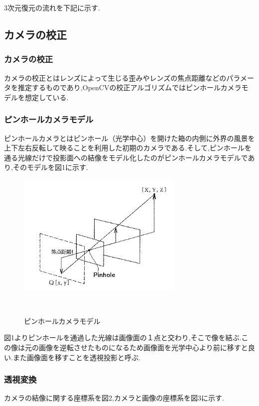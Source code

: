 \documentclass[a4paper]{jarticle}
\begin{document}
3次元復元の流れを下記に示す.

\subsection{カメラの校正}
\subsubsection{カメラの校正}
カメラの校正とはレンズによって生じる歪みやレンズの焦点距離などのパラメータを推定するものであり,OpenCVの校正アルゴリズムではピンホールカメラモデルを想定している.

\subsubsection{ピンホールカメラモデル}
ピンホールカメラとはピンホール（光学中心）を開けた箱の内側に外界の風景を上下左右反転して映ることを利用した初期のカメラである.そして,ピンホールを通る光線だけで投影面への結像をモデル化したのがピンホールカメラモデルであり,そのモデルを図1に示す.

\begin{figure}[b]
 \begin{center}
  \includegraphics[width=80mm]{image/pinhole.png}
 　\caption{ピンホールカメラモデル}%
 　\label{fig:02}%
 \end{center}
\end{figure}

図1よりピンホールを通過した光線は画像面の１点と交わり,そこで像を結ぶ.この像は元の画像を逆転させたものになるため画像面を光学中心より前に移すと良い.また画像面を移すことを透視投影と呼ぶ.

\subsubsection{透視変換}
カメラの結像に関する座標系を図2,カメラと画像の座標系を図3に示す.
\end{document}
